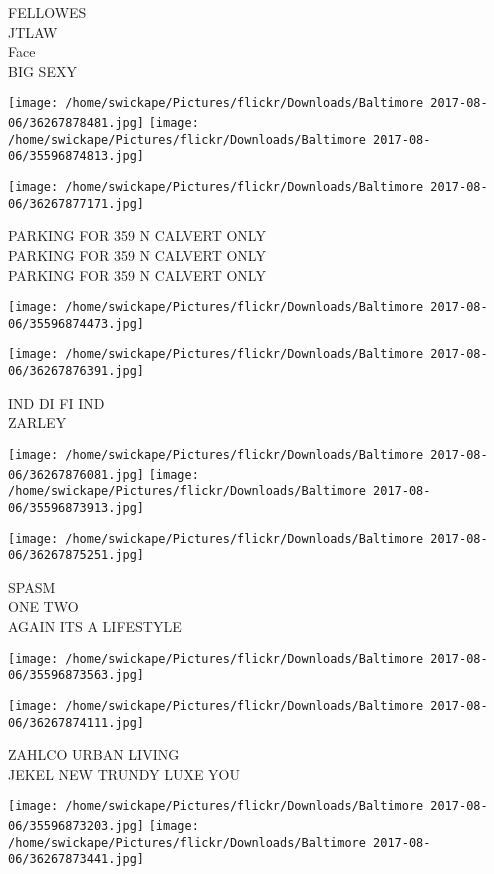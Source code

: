 \documentclass[10pt,letterpaper]{article}
\begin{document}
FELLOWES\\
JTLAW\\
Face\\
BIG SEXY
\pagebreak

\texttt{[image: /home/swickape/Pictures/flickr/Downloads/Baltimore 2017-08-06/36267878481.jpg]}
\texttt{[image: /home/swickape/Pictures/flickr/Downloads/Baltimore 2017-08-06/35596874813.jpg]}

\texttt{[image: /home/swickape/Pictures/flickr/Downloads/Baltimore 2017-08-06/36267877171.jpg]}

PARKING FOR 359 N CALVERT ONLY\\
PARKING FOR 359 N CALVERT ONLY\\
PARKING FOR 359 N CALVERT ONLY
\pagebreak

\texttt{[image: /home/swickape/Pictures/flickr/Downloads/Baltimore 2017-08-06/35596874473.jpg]}

\vspace{0.25in}
\texttt{[image: /home/swickape/Pictures/flickr/Downloads/Baltimore 2017-08-06/36267876391.jpg]}

IND DI FI IND\\
ZARLEY
\pagebreak

\texttt{[image: /home/swickape/Pictures/flickr/Downloads/Baltimore 2017-08-06/36267876081.jpg]}
\texttt{[image: /home/swickape/Pictures/flickr/Downloads/Baltimore 2017-08-06/35596873913.jpg]}

\vspace{0.25in}
\texttt{[image: /home/swickape/Pictures/flickr/Downloads/Baltimore 2017-08-06/36267875251.jpg]}

SPASM\\
ONE TWO\\
AGAIN ITS A LIFESTYLE
\pagebreak

\texttt{[image: /home/swickape/Pictures/flickr/Downloads/Baltimore 2017-08-06/35596873563.jpg]}

\vspace{0.25in}
\texttt{[image: /home/swickape/Pictures/flickr/Downloads/Baltimore 2017-08-06/36267874111.jpg]}

ZAHLCO URBAN LIVING\\
JEKEL NEW TRUNDY LUXE YOU
\pagebreak

\texttt{[image: /home/swickape/Pictures/flickr/Downloads/Baltimore 2017-08-06/35596873203.jpg]}
\texttt{[image: /home/swickape/Pictures/flickr/Downloads/Baltimore 2017-08-06/36267873441.jpg]}
\end{document}
